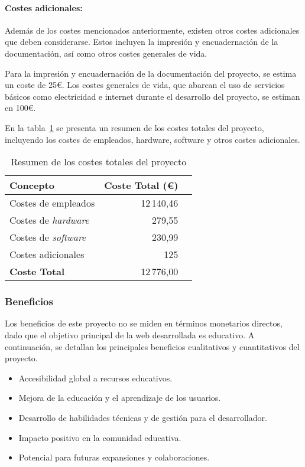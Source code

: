 \paragraph{Costes adicionales:} Además de los costes mencionados anteriormente, existen otros costes adicionales que deben considerarse. Estos incluyen la impresión y encuadernación de la documentación, así como otros costes generales de vida. 

Para la impresión y encuadernación de la documentación del proyecto, se estima un coste de 25€. Los costes generales de vida, que abarcan el uso de servicios básicos como electricidad e internet durante el desarrollo del proyecto, se estiman en 100€.

En la tabla~\ref{tabla:costes_totales} se presenta un resumen de los costes totales del proyecto, incluyendo los costes de empleados, hardware, software y otros costes adicionales.

\begin{table}[H]
    \centering
    \begin{tabular}{lrr}
        \toprule
        \textbf{Concepto}      & \textbf{Coste Total (€)} \\ \midrule
        Costes de empleados     & 12\,140,46                      \\
        Costes de \textit{hardware} & 279,55                       \\
        Costes de \textit{software} & 230,99                       \\
        Costes adicionales      & 125                         \\ \midrule
        \textbf{Coste Total}    & 12\,776,00                      \\ \bottomrule
    \end{tabular}
    \caption{Resumen de los costes totales del proyecto}
    \label{tabla:costes_totales}
\end{table}

\subsubsection{Beneficios}
Los beneficios de este proyecto no se miden en términos monetarios directos, dado que el objetivo principal de la web desarrollada es educativo. A continuación, se detallan los principales beneficios cualitativos y cuantitativos del proyecto.

\begin{itemize}
    \item Accesibilidad global a recursos educativos.
    \item Mejora de la educación y el aprendizaje de los usuarios.
    \item Desarrollo de habilidades técnicas y de gestión para el desarrollador.
    \item Impacto positivo en la comunidad educativa.
    \item Potencial para futuras expansiones y colaboraciones.
\end{itemize}

